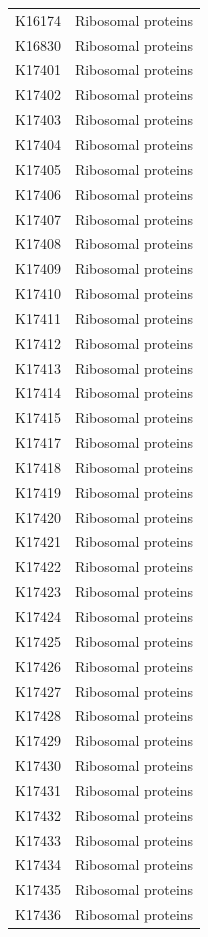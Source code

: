 \begin{longtable}{@{}l l@{}}
K16174 & Ribosomal proteins \\
K16830 & Ribosomal proteins \\
K17401 & Ribosomal proteins \\
K17402 & Ribosomal proteins \\
K17403 & Ribosomal proteins \\
K17404 & Ribosomal proteins \\
K17405 & Ribosomal proteins \\
K17406 & Ribosomal proteins \\
K17407 & Ribosomal proteins \\
K17408 & Ribosomal proteins \\
K17409 & Ribosomal proteins \\
K17410 & Ribosomal proteins \\
K17411 & Ribosomal proteins \\
K17412 & Ribosomal proteins \\
K17413 & Ribosomal proteins \\
K17414 & Ribosomal proteins \\
K17415 & Ribosomal proteins \\
K17417 & Ribosomal proteins \\
K17418 & Ribosomal proteins \\
K17419 & Ribosomal proteins \\
K17420 & Ribosomal proteins \\
K17421 & Ribosomal proteins \\
K17422 & Ribosomal proteins \\
K17423 & Ribosomal proteins \\
K17424 & Ribosomal proteins \\
K17425 & Ribosomal proteins \\
K17426 & Ribosomal proteins \\
K17427 & Ribosomal proteins \\
K17428 & Ribosomal proteins \\
K17429 & Ribosomal proteins \\
K17430 & Ribosomal proteins \\
K17431 & Ribosomal proteins \\
K17432 & Ribosomal proteins \\
K17433 & Ribosomal proteins \\
K17434 & Ribosomal proteins \\
K17435 & Ribosomal proteins \\
K17436 & Ribosomal proteins \\

\end{longtable}
